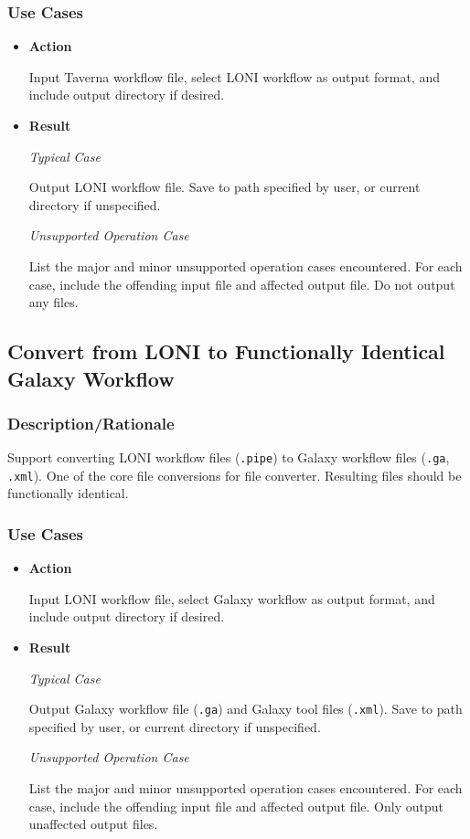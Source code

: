 \documentclass[12pt]{article}
\begin{document}
\subsubsection{Use Cases}
\begin{itemize}
\item \textbf{Action}

Input Taverna workflow file, select LONI workflow as output format, and include output directory if desired.


\item \textbf{Result}

\textit{Typical Case}

Output LONI workflow file. Save to path specified by user, or current directory if unspecified.

\textit{Unsupported Operation Case}

List the major and minor unsupported operation cases encountered. For each case, include the offending input file and affected output file. Do not output any files.
\end{itemize}


\subsection{Convert from LONI to Functionally Identical Galaxy Workflow}
\label{sec:lonigalaxy}
\subsubsection{Description/Rationale} Support converting LONI workflow files (\texttt{\texttt{.pipe}}) to Galaxy workflow files (\texttt{.ga}, \texttt{.xml}). One of the core file conversions for file converter. Resulting files should be functionally identical.

\subsubsection{Use Cases}
\begin{itemize}
\item \textbf{Action}

Input LONI workflow file, select Galaxy workflow as output format, and include output directory if desired.
\item \textbf{Result}

\textit{Typical Case}

Output Galaxy workflow file (\texttt{.ga}) and Galaxy tool files (\texttt{.xml}). Save to path specified by user, or current directory if unspecified.

\textit{Unsupported Operation Case}

List the major and minor unsupported operation cases encountered. For each case, include the offending input file and affected output file. Only output unaffected output files. 
\end{itemize}
\end{document}
